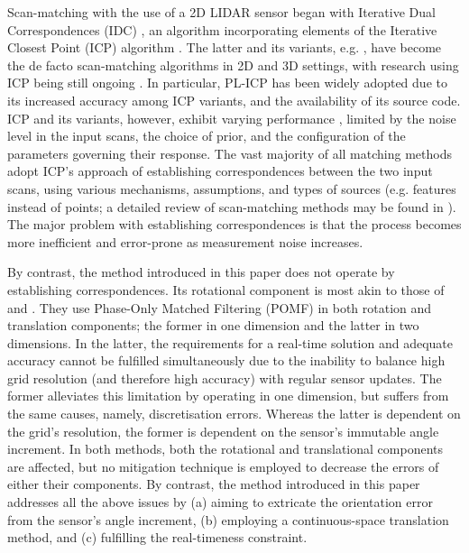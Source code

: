 Scan-matching with the use of a 2D LIDAR sensor began with Iterative Dual
Correspondences (IDC) \cite{FengLu1994}, an algorithm incorporating elements of
the Iterative Closest Point (ICP) algorithm \cite{Besl1992b}. The latter and
its variants, e.g.  \cite{Pfister,Chetverikov,Censi2008b,Segal2009}, have
become the de facto scan-matching algorithms in 2D and 3D settings, with
research using ICP being still ongoing
\cite{Wang2018a,Tian2019a,Marchel2020,Koide2021}. In particular, PL-ICP
\cite{Censi2008b} has been widely adopted due to its increased accuracy among
ICP variants, and the availability of its source code. ICP and its variants,
however, exhibit varying performance \cite{Donoso2017a}, limited by the noise
level in the input scans, the choice of prior, and the configuration of the
parameters governing their response. The vast majority of all matching methods
adopt ICP's approach of establishing correspondences between the two input
scans, using various mechanisms, assumptions, and types of sources (e.g.
features instead of points; a detailed review of scan-matching methods may be
found in \cite{Filotheou2020a}). The major problem with establishing
correspondences is that the process becomes more inefficient and error-prone as
measurement noise increases.

By contrast, the method introduced in this paper does not operate by
establishing correspondences. Its rotational component is most akin to those of
\cite{Yu2018} and \cite{Jiang2018}. They use Phase-Only Matched Filtering
(POMF) \cite{Qin-ShengChen1994} in both rotation and translation components;
the former in one dimension and the latter in two dimensions. In the latter,
the requirements for a real-time solution and adequate accuracy cannot be
fulfilled simultaneously due to the inability to balance high grid resolution
(and therefore high accuracy) with regular sensor updates. The former
alleviates this limitation by operating in one dimension, but suffers from the
same causes, namely, discretisation errors. Whereas the latter is dependent on
the grid's resolution, the former is dependent on the sensor's immutable angle
increment.  In both methods, both the rotational and translational components
are affected, but no mitigation technique is employed to decrease the errors of
either their components. By contrast, the method introduced in this paper
addresses all the above issues by (a) aiming to extricate the orientation error
from the sensor's angle increment, (b) employing a continuous-space translation
method, and (c) fulfilling the real-timeness constraint.
